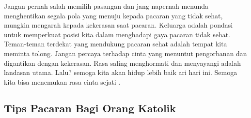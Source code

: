 \documentclass[11pt]{scrartcl}
\begin{document}
Jangan pernah salah memilih pasangan dan jang napernah menunda menghentikan segala pola yang menuju kepada pacaran yang tidak sehat, mungkin mengarah kepada kekerasan saat pacaran. Keluarga adalah pondasi untuk memperkuat posisi kita dalam menghadapi gaya pacaran tidak sehat. Teman-teman terdekat yang mendukung pacaran sehat adalah tempat kita meminta tolong. Jangan percaya terhadap cinta yang menuntut pengorbanan dan digantikan dengan kekerasan. Rasa saling menghormati dan menyayangi adalah landasan utama. Lalu? semoga kita akan hidup lebih baik ari hari ini. Semoga kita bisa menemukan rasa cinta sejati \cite{sony2009}.


\subsection*{Tips Pacaran Bagi Orang Katolik}
\end{document}
